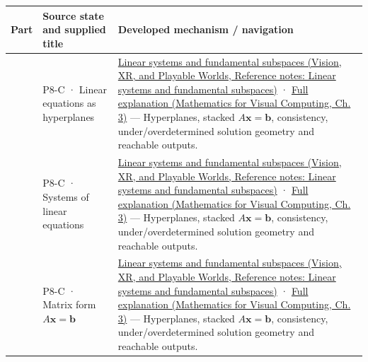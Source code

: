 {\def\LTcaptype{none} %
\begin{longtable}[]{@{}
  >{\raggedright\arraybackslash}p{}
  >{\raggedright\arraybackslash}p{}
  >{\raggedright\arraybackslash}p{}@{}}
\toprule\noalign{}
\begin{minipage}[b]{\linewidth}\raggedright
Part
\end{minipage} & \begin{minipage}[b]{\linewidth}\raggedright
Source state and supplied title
\end{minipage} & \begin{minipage}[b]{\linewidth}\raggedright
Developed mechanism / navigation
\end{minipage} \\
\midrule\noalign{}
\endhead
\bottomrule\noalign{}
\endlastfoot
701 & P8-C · Linear equations as hyperplanes & \href{../07-Vision-XR-and-Playable-Worlds/main.pdf\#nameddest=appendix-8572a4a060c1}{Linear systems and fundamental subspaces (Vision, XR, and Playable Worlds, Reference notes: Linear systems and fundamental subspaces)} · \href{../02-Mathematics-for-Visual-Computing/main.pdf\#nameddest=01-foundations-i-ch019-a-system-is-an-intersection-of-constraints}{Full explanation (Mathematics for Visual Computing, Ch. 3)} --- Hyperplanes, stacked \(A\mathbf x=\mathbf b\), consistency, under/overdetermined solution geometry and reachable outputs. \\
702 & P8-C · Systems of linear equations & \href{../07-Vision-XR-and-Playable-Worlds/main.pdf\#nameddest=appendix-8572a4a060c1}{Linear systems and fundamental subspaces (Vision, XR, and Playable Worlds, Reference notes: Linear systems and fundamental subspaces)} · \href{../02-Mathematics-for-Visual-Computing/main.pdf\#nameddest=01-foundations-i-ch019-a-system-is-an-intersection-of-constraints}{Full explanation (Mathematics for Visual Computing, Ch. 3)} --- Hyperplanes, stacked \(A\mathbf x=\mathbf b\), consistency, under/overdetermined solution geometry and reachable outputs. \\
703 & P8-C · Matrix form \(A\mathbf x=\mathbf b\) & \href{../07-Vision-XR-and-Playable-Worlds/main.pdf\#nameddest=appendix-8572a4a060c1}{Linear systems and fundamental subspaces (Vision, XR, and Playable Worlds, Reference notes: Linear systems and fundamental subspaces)} · \href{../02-Mathematics-for-Visual-Computing/main.pdf\#nameddest=01-foundations-i-ch019-a-system-is-an-intersection-of-constraints}{Full explanation (Mathematics for Visual Computing, Ch. 3)} --- Hyperplanes, stacked \(A\mathbf x=\mathbf b\), consistency, under/overdetermined solution geometry and reachable outputs. \\

\end{longtable}}

